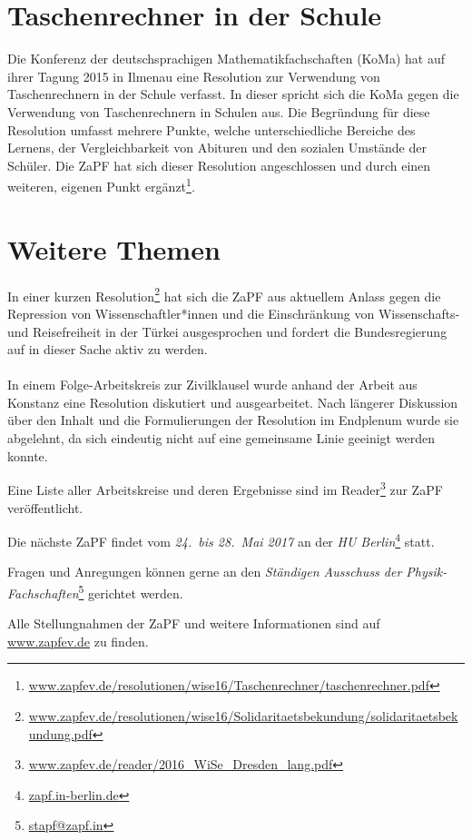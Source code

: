 \section*{Taschenrechner in der Schule}
Die Konferenz der deutschsprachigen Mathematikfachschaften (KoMa) hat auf ihrer Tagung 2015 in Ilmenau eine Resolution zur Verwendung von Taschenrechnern in der Schule 
verfasst. In dieser spricht sich die KoMa gegen die Verwendung von Taschenrechnern in Schulen aus. Die Begründung für diese Resolution umfasst mehrere Punkte, 
welche unterschiedliche Bereiche des Lernens, der Vergleichbarkeit von Abituren und den sozialen Umstände der Schüler. Die ZaPF hat sich dieser Resolution 
angeschlossen und durch einen weiteren, eigenen Punkt ergänzt\footnote{\href{https://zapfev.de/resolutionen/wise16/Taschenrechner/taschenrechner.pdf}{\url{www.zapfev.de/resolutionen/wise16/Taschenrechner/taschenrechner.pdf}}}. 
		
\section*{Weitere Themen}
In einer kurzen Resolution\footnote{\href{https://zapfev.de/resolutionen/wise16/Solidaritaetsbekundung/solidaritaetsbekundung.pdf}{\url{www.zapfev.de/resolutionen/wise16/Solidaritaetsbekundung/solidaritaetsbekundung.pdf}}} 
hat sich die ZaPF aus aktuellem Anlass gegen die Repression von Wissenschaftler*innen und die Einschränkung von Wissenschafts- und Reisefreiheit in der Türkei ausgesprochen 
und fordert die Bundesregierung auf in dieser Sache aktiv zu werden.\\ \\
In einem Folge-Arbeitskreis zur Zivilklausel wurde anhand der Arbeit aus Konstanz eine Resolution diskutiert und ausgearbeitet. Nach längerer Diskussion über den 
Inhalt und die Formulierungen der Resolution im Endplenum wurde sie abgelehnt, da sich eindeutig nicht auf eine gemeinsame Linie geeinigt werden konnte.
				
		
Eine Liste aller Arbeitskreise und deren Ergebnisse sind im
Reader\footnote{\href{http://www.zapfev.de/reader/2016_WiSe_Dresden_lang.pdf}{\url{www.zapfev.de/reader/2016_WiSe_Dresden_lang.pdf}}}
zur ZaPF veröffentlicht.
		
\vfill
		
Die nächste ZaPF findet vom \emph{24.\ bis 28.\ Mai 2017} an der  \emph{HU Berlin}\footnote{\href{zapf.in-berlin.de}{\url{zapf.in-berlin.de}}} statt.
		
Fragen und Anregungen können gerne an den \emph{Ständigen Ausschuss der Physik-Fachschaften}\footnote{\href{mailto:stapf@zapf.in}{\url{stapf@zapf.in}}} gerichtet werden.
		
Alle Stellungnahmen der ZaPF und weitere Informationen sind auf \href{http://www.zapfev.de}{\url{www.zapfev.de}} zu finden.
		
		
		
		
